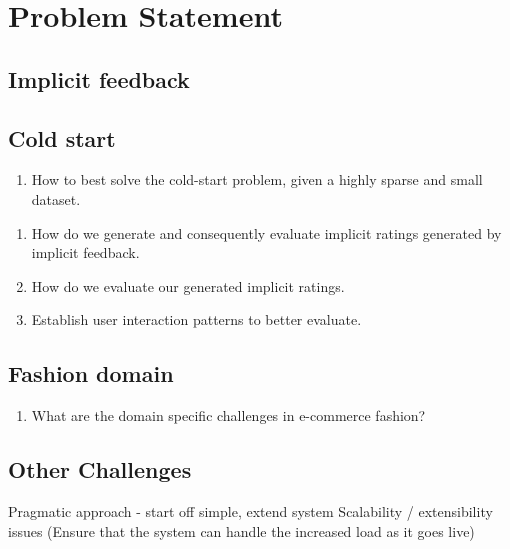 \section{Problem Statement}

\subsection{Implicit feedback}

\subsection{Cold start}
\begin{enumerate}
  \item How to best solve the cold-start problem, given a highly sparse and
  small dataset.
\end{enumerate}

\begin{enumerate}
  \item How do we generate and consequently evaluate implicit ratings generated by implicit feedback.
  \item How do we evaluate our generated implicit ratings.
  \item Establish user interaction patterns to better evaluate.
\end{enumerate}

\subsection{Fashion domain}
\begin{enumerate}
  \item What are the domain specific challenges in e-commerce fashion?
\end{enumerate}

\subsection{Other Challenges}
Pragmatic approach - start off simple, extend system
Scalability / extensibility issues (Ensure that the system can handle the increased load as it goes live)


